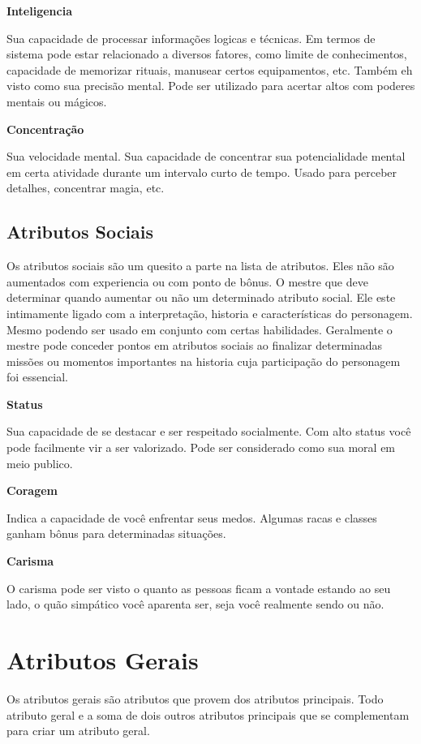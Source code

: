 \textbf{Inteligencia}

Sua capacidade de processar informações logicas e técnicas. Em termos de sistema pode estar relacionado a diversos fatores, como limite de conhecimentos, capacidade de memorizar rituais, manusear certos equipamentos, etc. Também eh visto como sua precisão mental. Pode ser utilizado para acertar altos com poderes mentais ou mágicos.

\textbf{Concentração}

Sua velocidade mental. Sua capacidade de concentrar sua potencialidade mental em certa atividade durante um intervalo curto de tempo. Usado para perceber detalhes, concentrar magia, etc.

\subsection{Atributos Sociais}

Os atributos sociais são um quesito a parte na lista de atributos. Eles não são aumentados com experiencia ou com ponto de bônus. O mestre que deve determinar quando aumentar ou não um determinado atributo social. Ele este intimamente ligado com a interpretação, historia e características do personagem. Mesmo podendo ser usado em conjunto com certas habilidades. Geralmente o mestre pode conceder pontos em atributos sociais ao finalizar determinadas missões ou momentos importantes na historia cuja participação do personagem foi essencial.

\textbf{Status}

Sua capacidade de se destacar e ser respeitado socialmente. Com alto status você pode facilmente vir a ser valorizado. Pode ser considerado como sua moral em meio publico.

\textbf{Coragem}

Indica a capacidade de você enfrentar seus medos. Algumas racas e classes ganham bônus para determinadas situações.

\textbf{Carisma}

O carisma pode ser visto o quanto as pessoas ficam a vontade estando ao seu lado, o quão simpático você aparenta ser, seja você realmente sendo ou não.

\section{Atributos Gerais}

Os atributos gerais são atributos que provem dos atributos principais. Todo atributo geral e a soma de dois outros atributos principais que se complementam para criar um atributo geral.

